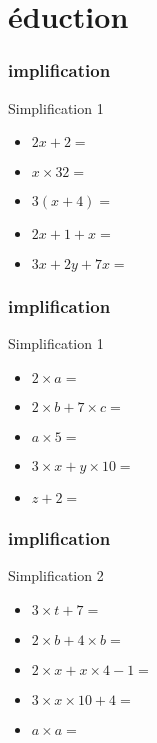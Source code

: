 \documentclass{beamer}
\begin{document}
\frame{\titlepage}

\section{éduction}


\begin{frame}
  \frametitle{implification}
  \begin{exampleblock}{Simplification 1}
    \begin{itemize}
    \item $2x + 2        = $
    \item $x \times 32   = $
    \item $3(x + 4)      = $
    \item $2x + 1 + x    = $
    \item $3x + 2y + 7x  = $ 
    \end{itemize}
  \end{exampleblock}
\end{frame}


\begin{frame}
  \frametitle{implification}
  \begin{exampleblock}{Simplification 1}
    \begin{itemize}
    \item $ 2 \times a               = $
    \item $ 2 \times b + 7 \times c  = $
    \item $ a \times 5               = $
    \item $ 3 \times x + y \times 10 = $
    \item $ z + 2                    = $
    \end{itemize}
  \end{exampleblock}
\end{frame}

\begin{frame}
  \frametitle{implification}
  \begin{exampleblock}{Simplification 2}
    \begin{itemize}
    \item<1-> $ 3 \times t + 7              = $
    \item<2-> $ 2 \times b + 4 \times b     = $
    \item<3-> $ 2 \times x + x \times 4 - 1 = $
    \item<4-> $ 3 \times x \times 10 + 4    = $
    \item<5-> $ a \times a                  = $
    \end{itemize}
  \end{exampleblock}
\end{frame}
\end{document}
